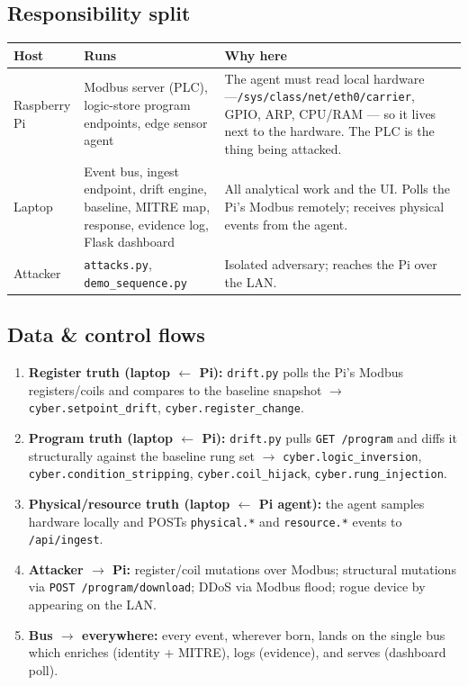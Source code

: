 \documentclass[11pt,a4paper]{article}
\newcommand{\code}[1]{\texttt{\small #1}}
\begin{document}
\subsection{Responsibility split}
\begin{tabularx}{\textwidth}{@{}p{2.6cm} L L@{}}
\toprule
\textbf{Host} & \textbf{Runs} & \textbf{Why here} \\
\midrule
Raspberry Pi & Modbus server (PLC), logic-store program endpoints, edge sensor agent &
  The agent must read local hardware ---\code{/sys/class/net/eth0/carrier}, GPIO, ARP, CPU/RAM ---
  so it lives next to the hardware. The PLC is the thing being attacked. \\
\addlinespace
Laptop & Event bus, ingest endpoint, drift engine, baseline, MITRE map, response, evidence log,
  Flask dashboard & All analytical work and the UI. Polls the Pi's Modbus remotely; receives
  physical events from the agent. \\
\addlinespace
Attacker & \code{attacks.py}, \code{demo\_sequence.py} & Isolated adversary; reaches the Pi over
  the LAN. \\
\bottomrule
\end{tabularx}

\subsection{Data \& control flows}
\begin{enumerate}[leftmargin=1.5em,itemsep=2pt]
  \item \textbf{Register truth (laptop $\leftarrow$ Pi):} \code{drift.py} polls the Pi's Modbus
        registers/coils and compares to the baseline snapshot $\rightarrow$
        \code{cyber.setpoint\_drift}, \code{cyber.register\_change}.
  \item \textbf{Program truth (laptop $\leftarrow$ Pi):} \code{drift.py} pulls \code{GET /program}
        and diffs it structurally against the baseline rung set $\rightarrow$
        \code{cyber.logic\_inversion}, \code{cyber.condition\_stripping}, \code{cyber.coil\_hijack},
        \code{cyber.rung\_injection}.
  \item \textbf{Physical/resource truth (laptop $\leftarrow$ Pi agent):} the agent samples hardware
        locally and POSTs \code{physical.*} and \code{resource.*} events to \code{/api/ingest}.
  \item \textbf{Attacker $\rightarrow$ Pi:} register/coil mutations over Modbus; structural mutations
        via \code{POST /program/download}; DDoS via Modbus flood; rogue device by appearing on the LAN.
  \item \textbf{Bus $\rightarrow$ everywhere:} every event, wherever born, lands on the single bus
        which enriches (identity + MITRE), logs (evidence), and serves (dashboard poll).
\end{enumerate}
\end{document}
